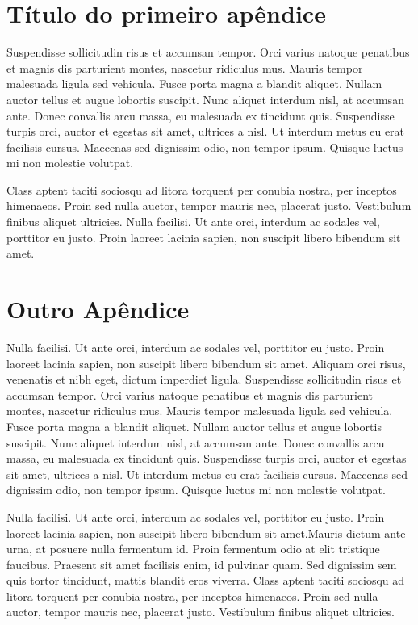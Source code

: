 \begin{apendicesenv}

\partapendices

\chapter{Título do primeiro apêndice}

Suspendisse sollicitudin risus et accumsan tempor. Orci varius natoque penatibus et magnis dis parturient montes, nascetur ridiculus mus. Mauris tempor malesuada ligula sed vehicula. Fusce porta magna a blandit aliquet. Nullam auctor tellus et augue lobortis suscipit. Nunc aliquet interdum nisl, at accumsan ante. Donec convallis arcu massa, eu malesuada ex tincidunt quis. Suspendisse turpis orci, auctor et egestas sit amet, ultrices a nisl. Ut interdum metus eu erat facilisis cursus. Maecenas sed dignissim odio, non tempor ipsum. Quisque luctus mi non molestie volutpat.

Class aptent taciti sociosqu ad litora torquent per conubia nostra, per inceptos himenaeos. Proin sed nulla auctor, tempor mauris nec, placerat justo. Vestibulum finibus aliquet ultricies. Nulla facilisi. Ut ante orci, interdum ac sodales vel, porttitor eu justo. Proin laoreet lacinia sapien, non suscipit libero bibendum sit amet. 

\chapter{Outro Apêndice}
Nulla facilisi. Ut ante orci, interdum ac sodales vel, porttitor eu justo. Proin laoreet lacinia sapien, non suscipit libero bibendum sit amet. Aliquam orci risus, venenatis et nibh eget, dictum imperdiet ligula. Suspendisse sollicitudin risus et accumsan tempor. Orci varius natoque penatibus et magnis dis parturient montes, nascetur ridiculus mus. Mauris tempor malesuada ligula sed vehicula. Fusce porta magna a blandit aliquet. Nullam auctor tellus et augue lobortis suscipit. Nunc aliquet interdum nisl, at accumsan ante. Donec convallis arcu massa, eu malesuada ex tincidunt quis. Suspendisse turpis orci, auctor et egestas sit amet, ultrices a nisl. Ut interdum metus eu erat facilisis cursus. Maecenas sed dignissim odio, non tempor ipsum. Quisque luctus mi non molestie volutpat.

Nulla facilisi. Ut ante orci, interdum ac sodales vel, porttitor eu justo. Proin laoreet lacinia sapien, non suscipit libero bibendum sit amet.Mauris dictum ante urna, at posuere nulla fermentum id. Proin fermentum odio at elit tristique faucibus. Praesent sit amet facilisis enim, id pulvinar quam. Sed dignissim sem quis tortor tincidunt, mattis blandit eros viverra. Class aptent taciti sociosqu ad litora torquent per conubia nostra, per inceptos himenaeos. Proin sed nulla auctor, tempor mauris nec, placerat justo. Vestibulum finibus aliquet ultricies.  

\end{apendicesenv}

